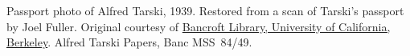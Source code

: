 Passport photo of Alfred Tarski, 1939. Restored from a scan of
Tarski's passport by Joel Fuller. Original courtesy of
\href{http://www.lib.berkeley.edu/libraries/bancroft-library}{Bancroft
  Library, University of California, Berkeley}. Alfred Tarski Papers,
Banc MSS~84/49.
